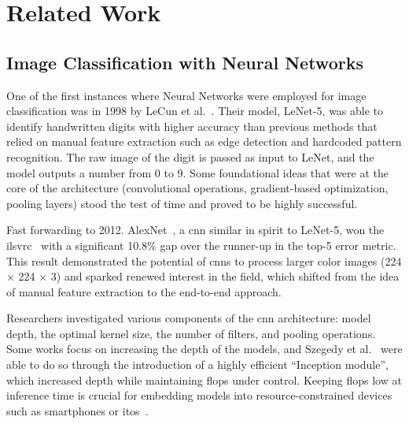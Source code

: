 \chapter{Related Work}
\label{ch:related-work}

\section{Image Classification with Neural Networks}
\label{sec:image-classification-with-neural-networks}

One of the first instances where Neural Networks were employed for image classification was in 1998 by LeCun et al.~\cite{GradientBasedLecun1998}. Their model, LeNet-5, was able to identify handwritten digits with higher accuracy than previous methods that relied on manual feature extraction such as edge detection and hardcoded pattern recognition. The raw image of the digit is passed as input to LeNet, and the model outputs a number from 0 to 9.
Some foundational ideas that were at the core of the architecture (convolutional operations, gradient-based optimization, pooling layers) stood the test of time and proved to be highly successful.

Fast forwarding to 2012. AlexNet~\cite{ImagenetClassiKrizhe2017}, a \acrfull{cnn} similar in spirit to LeNet-5, won the \acrfull{ilsvrc}~\cite{ImagenetLargeRussak2014} with a significant 10.8\% gap over the runner-up in the top-5 error metric. This result demonstrated the potential of \acrshort{cnn}s to process larger color images (224 × 224 × 3) and sparked renewed interest in the field, which shifted from the idea of manual feature extraction to the end-to-end approach.

Researchers investigated various components of the \acrshort{cnn} architecture: model depth, the optimal kernel size, the number of filters, and pooling operations. Some works \cite{VeryDeepConvoSimony2014, GoingDeeperWiSzeged2014} focus on increasing the depth of the models, and Szegedy et al.~\cite{GoingDeeperWiSzeged2014} were able to do so through the introduction of a highly efficient ``Inception module'', which increased depth while maintaining \acrfull{flops} under control. Keeping \acrshort{flops} low at inference time is crucial for embedding models into resource-constrained devices such as smartphones or \acrfull{itos}~\cite{SqueezenetAleIandol2016, MnasnetPlatfoTanM2018, MobilenetsEffHoward2017}.


